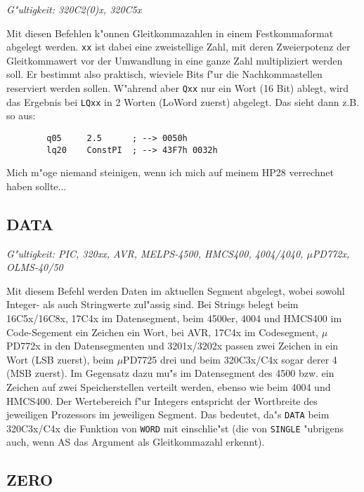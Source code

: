 \documentclass[12pt,a4paper,twoside]{report}
\makeatletter
\newcommand{\tty}[1]{{\tt #1}}
\newcommand{\ttindex}[1]{\index{#1@{\tt #1}}}
\makeatother
\begin{document}
{\em G"ultigkeit: 320C2(0)x, 320C5x}

Mit diesen Befehlen k"onnen Gleitkommazahlen in einem Festkommaformat
abgelegt werden.  \tty{xx} ist dabei eine zweistellige Zahl, mit deren
Zweierpotenz der Gleitkommawert vor der Umwandlung in eine ganze Zahl
multipliziert werden soll.  Er bestimmt also praktisch, wieviele Bits
f"ur die Nachkommastellen reserviert werden sollen.  W"ahrend aber
\tty{Qxx} nur ein Wort (16 Bit) ablegt, wird das Ergebnis bei \tty{LQxx}
in 2 Worten (LoWord zuerst) abgelegt.  Das sieht dann z.B. so
aus:
\begin{verbatim}
        q05     2.5      ; --> 0050h
        lq20    ConstPI  ; --> 43F7h 0032h
\end{verbatim}
Mich m"oge niemand steinigen, wenn ich mich auf meinem HP28
verrechnet haben sollte...


\subsection{DATA}
\ttindex{DATA}

{\em G"ultigkeit: PIC, 320xx, AVR, MELPS-4500, HMCS400, 4004/4040,
 $\mu$PD772x, OLMS-40/50}

Mit diesem Befehl werden Daten im aktuellen Segment abgelegt,
wobei sowohl Integer- als auch Stringwerte zul"assig sind.  Bei
Strings belegt beim 16C5x/16C8x, 17C4x im Datensegment, beim
4500er, 4004 und HMCS400 im Code-Segement ein Zeichen ein Wort,
bei AVR, 17C4x im Codesegment, $\mu$PD772x in den Datensegmenten
und 3201x/3202x passen zwei Zeichen in ein Wort (LSB zuerst),
beim $\mu$PD7725 drei und beim 320C3x/C4x sogar derer 4 (MSB
zuerst).  Im Gegensatz dazu mu"s im Datensegment des 4500 bzw.
ein Zeichen auf zwei Speicherstellen verteilt werden, ebenso wie
beim 4004 und HMCS400.  Der Wertebereich f"ur Integers entspricht
der Wortbreite des jeweiligen Prozessors im jeweiligen Segment.
Das bedeutet, da"s \tty{DATA} beim 320C3x/C4x die Funktion von
\tty{WORD} mit einschlie"st (die von \tty{SINGLE} "ubrigens auch,
wenn AS das Argument als Gleitkommazahl erkennt).


\subsection{ZERO}
\ttindex{ZERO}
\end{document}
